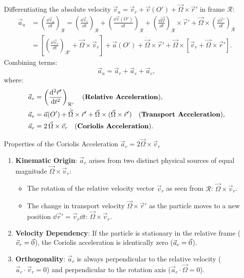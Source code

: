 Differentiating the absolute velocity $\vec{v}_a = \vec{v}_r + \vec{v}(O') + \vec{\Omega}\times\vec{r}'$ in frame $\mathcal{R}$:
\begin{align*}
\vec{a}_a &= \left(\frac{\dd\vec{v}_a}{\dd t}\right)_{\mathcal{R}} = \left(\frac{\dd\vec{v}_r}{\dd t}\right)_{\mathcal{R}} + \left(\frac{\dd\vec{v}(O')}{\dd t}\right)_{\mathcal{R}} + \left(\frac{\dd\vec{\Omega}}{\dd t}\right)_{\mathcal{R}}\times\vec{r}' + \vec{\Omega}\times\left(\frac{\dd\vec{r}'}{\dd t}\right)_{\mathcal{R}} \\
&= \left[\left(\frac{\dd\vec{v}_r}{\dd t}\right)_{\mathcal{R}'} + \vec{\Omega}\times\vec{v}_r\right] + \vec{a}(O') + \dot{\vec{\Omega}}\times\vec{r}' + \vec{\Omega}\times\left[\vec{v}_r + \vec{\Omega}\times\vec{r}'\right].
\end{align*}
Combining terms:
\[
\boxed{\vec{a}_a = \vec{a}_r + \vec{a}_e + \vec{a}_c,}
\]
where:
\begin{align}
\vec{a}_r &= \left(\frac{\mathrm{d}^2\vec{r}'}{\mathrm{d} t^2}\right)_{\mathcal{R}'} \quad \text{(\textbf{Relative Acceleration})}, \\
\vec{a}_e &= \vec{a}(O') + \dot{\vec{\Omega}}\times\vec{r}' + \vec{\Omega}\times(\vec{\Omega}\times\vec{r}') \quad \text{(\textbf{Transport Acceleration})}, \\
\vec{a}_c &= 2\,\vec{\Omega}\times\vec{v}_r \quad \text{(\textbf{Coriolis Acceleration})}.
\end{align}

\begin{lawbox}{Properties of the Coriolis Acceleration $\vec{a}_c = 2\vec{\Omega}\times\vec{v}_r$}
\begin{enumerate}[leftmargin=1.5em,itemsep=2pt]
  \item \textbf{Kinematic Origin}: $\vec{a}_c$ arises from two distinct physical sources of equal magnitude $\vec{\Omega}\times\vec{v}_r$:
  \begin{itemize}[leftmargin=1.2em]
    \item The rotation of the relative velocity vector $\vec{v}_r$ as seen from $\mathcal{R}$: $\vec{\Omega}\times\vec{v}_r$.
    \item The change in transport velocity $\vec{\Omega}\times\vec{r}'$ as the particle moves to a new position $\dd\vec{r}' = \vec{v}_r\dd t$: $\vec{\Omega}\times\vec{v}_r$.
  \end{itemize}
  \item \textbf{Velocity Dependency}: If the particle is stationary in the relative frame ($\vec{v}_r = \vec{0}$), the Coriolis acceleration is identically zero ($\vec{a}_c = \vec{0}$).
  \item \textbf{Orthogonality}: $\vec{a}_c$ is always perpendicular to the relative velocity ($\vec{a}_c\cdot\vec{v}_r = 0$) and perpendicular to the rotation axis ($\vec{a}_c\cdot\vec{\Omega} = 0$).
\end{enumerate}
\end{lawbox}

